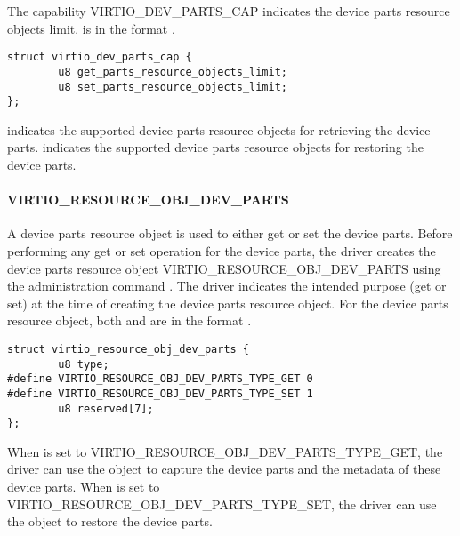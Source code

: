 The capability VIRTIO_DEV_PARTS_CAP indicates the device parts resource objects limit.
 is in the format .

\begin{lstlisting}
struct virtio_dev_parts_cap {
        u8 get_parts_resource_objects_limit;
        u8 set_parts_resource_objects_limit;
};
\end{lstlisting}

 indicates the supported device parts
resource objects for retrieving the device parts.
 indicates the supported device parts
resource objects for restoring the device parts.

\paragraph{VIRTIO_RESOURCE_OBJ_DEV_PARTS}\label{par:Basic Facilities of a Virtio Device / Device groups / Group administration commands / Device parts / VIRTIO_RESOURCE_OBJ_DEV_PARTS}

A device parts resource object is used to either get or set the device parts.
Before performing any get or set operation for the device parts, the driver
creates the device parts resource object
VIRTIO_RESOURCE_OBJ_DEV_PARTS using the administration command
.
The driver indicates the intended purpose (get or set) at the time of creating the
device parts resource object.
For the device parts resource object, both  and
 are in the format
.

\begin{lstlisting}
struct virtio_resource_obj_dev_parts {
        u8 type;
#define VIRTIO_RESOURCE_OBJ_DEV_PARTS_TYPE_GET 0
#define VIRTIO_RESOURCE_OBJ_DEV_PARTS_TYPE_SET 1
        u8 reserved[7];
};
\end{lstlisting}

When  is set to VIRTIO_RESOURCE_OBJ_DEV_PARTS_TYPE_GET,
the driver can use the object to capture the device parts and the metadata of
these device parts. When  is set to
VIRTIO_RESOURCE_OBJ_DEV_PARTS_TYPE_SET, the driver can use the
object to restore the device parts.

